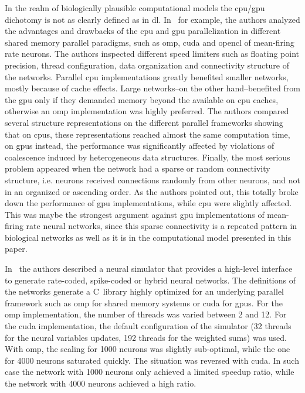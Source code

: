 \documentclass[10pt,journal,compsoc]{IEEEtran}
\newcommand{\CC}{C\nolinebreak\hspace{-.05em}\raisebox{.4ex}{\tiny\bf +}\nolinebreak\hspace{-.10em}\raisebox{.4ex}{\tiny\bf +}}
\begin{document}
In the realm of biologically plausible computational models the \gls{cpu}/\gls{gpu} dichotomy is not as clearly defined as in \gls{dl}. In~\cite{doi:10.3109/0954898X.2012.739292} for example, the authors analyzed the advantages and drawbacks of the \gls{cpu} and \gls{gpu} parallelization in different shared memory parallel paradigms, such as \gls{omp}, \gls{cuda} and \gls{opencl} of mean-firing rate neurons. The authors inspected different speed limiters such as floating point precision, thread configuration, data organization and connectivity structure of the networks. Parallel \gls{cpu} implementations greatly benefited smaller networks, mostly because of cache effects. Large networks--on the other hand--benefited from the \gls{gpu} only if they demanded memory beyond the available on \gls{cpu} caches, otherwise an \gls{omp} implementation was highly preferred. The authors compared several structure representations on the different parallel frameworks showing that on \glspl{cpu}, these representations reached almost the same computation time, on \glspl{gpu} instead, the performance was significantly affected by violations of coalescence induced by heterogeneous data structures. Finally, the most serious problem appeared when the network had a sparse or random connectivity structure, i.e. neurons received connections randomly from other neurons, and not in an organized or ascending order. As the authors pointed out, this totally broke down the performance of \gls{gpu} implementations, while \gls{cpu} were slightly affected. This was maybe the strongest argument against \gls{gpu} implementations of mean-firing rate neural networks, since this sparse connectivity is a repeated pattern in biological networks as well as it is in the computational model presented in this paper.

In~\cite{10.3389/fninf.2015.00019} the authors described a neural simulator that provides a high-level interface to generate rate-coded, spike-coded or hybrid neural networks. The definitions of the networks generate a \CC~library highly optimized for an underlying parallel framework such as \gls{omp} for shared memory systems or \gls{cuda} for \glspl{gpu}. For the \gls{omp} implementation, the number of threads was varied between 2 and 12. For the \gls{cuda} implementation, the default configuration of the simulator (32 threads for the neural variables updates, 192 threads for the weighted sums) was used. With \gls{omp}, the scaling for 1000 neurons was slightly sub-optimal, while the one for 4000 neurons saturated quickly. The situation was reversed with \gls{cuda}. In such case the network with 1000 neurons only achieved a limited speedup ratio, while the network with 4000 neurons achieved a high ratio.
\end{document}
